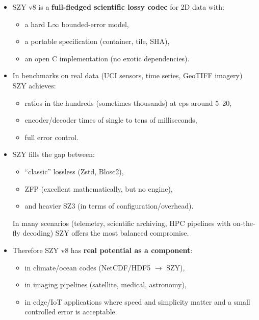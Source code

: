 \documentclass[11pt,a4paper]{article}
\newif\ifincludeplots
\begin{document}
\begin{itemize}
  \item SZY v8 is a \textbf{full-fledged scientific lossy codec} for 2D data with:
        \begin{itemize}
          \item a hard L$\infty$ bounded-error model,
          \item a portable specification (container, tile, SHA),
          \item an open C implementation (no exotic dependencies).
        \end{itemize}
  \item In benchmarks on real data (UCI sensors, time series, GeoTIFF imagery) SZY achieves:
        \begin{itemize}
          \item ratios in the hundreds (sometimes thousands) at eps around 5--20,
          \item encoder/decoder times of single to tens of milliseconds,
          \item full error control.
        \end{itemize}
  \item SZY fills the gap between:
        \begin{itemize}
          \item ``classic'' lossless (Zstd, Blosc2),
          \item ZFP (excellent mathematically, but no engine),
          \item and heavier SZ3 (in terms of configuration/overhead).
        \end{itemize}
        In many scenarios (telemetry, scientific archiving, HPC pipelines with on-the-fly decoding) SZY offers the most balanced compromise.
  \item Therefore SZY v8 has \textbf{real potential as a component}:
        \begin{itemize}
          \item in climate/ocean codes (NetCDF/HDF5 $\rightarrow$ SZY),
          \item in imaging pipelines (satellite, medical, astronomy),
          \item in edge/IoT applications where speed and simplicity matter and a small controlled error is acceptable.
        \end{itemize}
\end{itemize}

\FloatBarrier
\clearpage
\ifincludeplots
\end{document}
